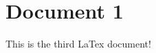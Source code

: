 \documentclass{article}
\begin{document}
\section*{Document 1}
This is the third LaTex document!
\end{document}
